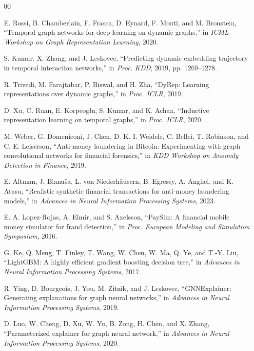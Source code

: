\documentclass[conference]{IEEEtran}
\begin{document}
\begin{thebibliography}{00}

 E. Rossi, B. Chamberlain, F. Frasca, D. Eynard, F.
Monti, and M. Bronstein, ``Temporal graph networks for deep learning on dynamic
graphs,'' in \emph{ICML Workshop on Graph Representation Learning}, 2020.

 S. Kumar, X. Zhang, and J. Leskovec, ``Predicting
dynamic embedding trajectory in temporal interaction networks,'' in \emph{Proc.
KDD}, 2019, pp. 1269--1278.

 R. Trivedi, M. Farajtabar, P. Biswal, and H. Zha,
``DyRep: Learning representations over dynamic graphs,'' in \emph{Proc. ICLR},
2019.

 D. Xu, C. Ruan, E. Korpeoglu, S. Kumar, and K. Achan,
``Inductive representation learning on temporal graphs,'' in \emph{Proc. ICLR},
2020.

 M. Weber, G. Domeniconi, J. Chen, D. K. I. Weidele,
C. Bellei, T. Robinson, and C. E. Leiserson, ``Anti-money laundering in Bitcoin:
Experimenting with graph convolutional networks for financial forensics,'' in
\emph{KDD Workshop on Anomaly Detection in Finance}, 2019.

 E. Altman, J. Blanu\v{s}a, L. von Niederh\"{a}usern, B.
Egressy, A. Anghel, and K. Atasu, ``Realistic synthetic financial transactions
for anti-money laundering models,'' in \emph{Advances in Neural Information
Processing Systems}, 2023.

 E. A. Lopez-Rojas, A. Elmir, and S. Axelsson,
``PaySim: A financial mobile money simulator for fraud detection,'' in
\emph{Proc. European Modeling and Simulation Symposium}, 2016.

 G. Ke, Q. Meng, T. Finley, T. Wang, W. Chen, W. Ma, Q.
Ye, and T.-Y. Liu, ``LightGBM: A highly efficient gradient boosting decision
tree,'' in \emph{Advances in Neural Information Processing Systems}, 2017.

 R. Ying, D. Bourgeois, J. You, M. Zitnik, and J.
Leskovec, ``GNNExplainer: Generating explanations for graph neural networks,''
in \emph{Advances in Neural Information Processing Systems}, 2019.

 D. Luo, W. Cheng, D. Xu, W. Yu, B. Zong, H. Chen,
and X. Zhang, ``Parameterized explainer for graph neural network,'' in
\emph{Advances in Neural Information Processing Systems}, 2020.


\end{thebibliography}
\end{document}
